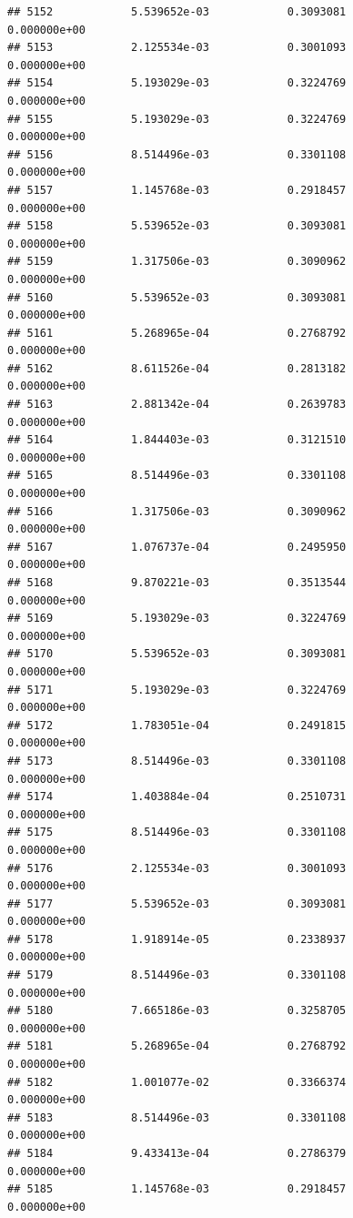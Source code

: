 \documentclass[
]{article}
\begin{document}
\begin{verbatim}
## 5152            5.539652e-03            0.3093081            0.000000e+00
## 5153            2.125534e-03            0.3001093            0.000000e+00
## 5154            5.193029e-03            0.3224769            0.000000e+00
## 5155            5.193029e-03            0.3224769            0.000000e+00
## 5156            8.514496e-03            0.3301108            0.000000e+00
## 5157            1.145768e-03            0.2918457            0.000000e+00
## 5158            5.539652e-03            0.3093081            0.000000e+00
## 5159            1.317506e-03            0.3090962            0.000000e+00
## 5160            5.539652e-03            0.3093081            0.000000e+00
## 5161            5.268965e-04            0.2768792            0.000000e+00
## 5162            8.611526e-04            0.2813182            0.000000e+00
## 5163            2.881342e-04            0.2639783            0.000000e+00
## 5164            1.844403e-03            0.3121510            0.000000e+00
## 5165            8.514496e-03            0.3301108            0.000000e+00
## 5166            1.317506e-03            0.3090962            0.000000e+00
## 5167            1.076737e-04            0.2495950            0.000000e+00
## 5168            9.870221e-03            0.3513544            0.000000e+00
## 5169            5.193029e-03            0.3224769            0.000000e+00
## 5170            5.539652e-03            0.3093081            0.000000e+00
## 5171            5.193029e-03            0.3224769            0.000000e+00
## 5172            1.783051e-04            0.2491815            0.000000e+00
## 5173            8.514496e-03            0.3301108            0.000000e+00
## 5174            1.403884e-04            0.2510731            0.000000e+00
## 5175            8.514496e-03            0.3301108            0.000000e+00
## 5176            2.125534e-03            0.3001093            0.000000e+00
## 5177            5.539652e-03            0.3093081            0.000000e+00
## 5178            1.918914e-05            0.2338937            0.000000e+00
## 5179            8.514496e-03            0.3301108            0.000000e+00
## 5180            7.665186e-03            0.3258705            0.000000e+00
## 5181            5.268965e-04            0.2768792            0.000000e+00
## 5182            1.001077e-02            0.3366374            0.000000e+00
## 5183            8.514496e-03            0.3301108            0.000000e+00
## 5184            9.433413e-04            0.2786379            0.000000e+00
## 5185            1.145768e-03            0.2918457            0.000000e+00

\end{verbatim}
\end{document}
